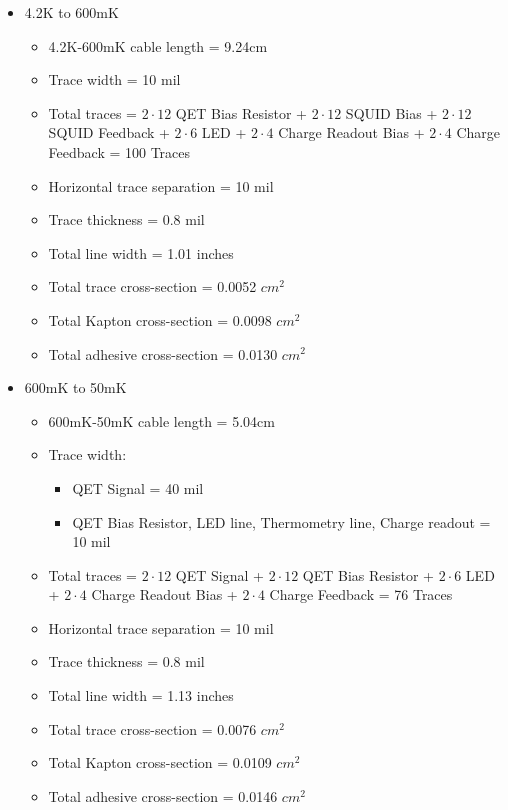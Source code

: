 \documentclass{report}
\begin{document}
\begin{itemize}
\item 4.2K to 600mK
    \begin{itemize}
    \item 4.2K-600mK cable length = 9.24cm
    \item Trace width = 10 mil
    \item Total traces = $2\cdot12$ QET Bias Resistor + $2\cdot12$ SQUID Bias + $2\cdot12$ SQUID Feedback + $2\cdot6$ LED + $2\cdot4$ Charge Readout Bias + $2\cdot4$ Charge Feedback = 100 Traces
    \item Horizontal trace separation = 10 mil
    \item Trace thickness = 0.8 mil
    \item Total line width = 1.01 inches
    \item Total trace cross-section = 0.0052 $cm^2$
    \item Total Kapton cross-section = 0.0098 $cm^2$
    \item Total adhesive cross-section = 0.0130 $cm^2$
    \end{itemize}
\item 600mK to 50mK
    \begin{itemize}
    \item 600mK-50mK cable length = 5.04cm
    \item Trace width:
        \begin{itemize}
        \item QET Signal = 40 mil
        \item QET Bias Resistor, LED line, Thermometry line, Charge readout = 10 mil
        \end{itemize}
    \item Total traces = $2\cdot12$ QET Signal + $2\cdot12$ QET Bias Resistor + $2\cdot6$ LED + $2\cdot4$ Charge Readout Bias + $2\cdot4$ Charge Feedback = 76 Traces
    \item Horizontal trace separation = 10 mil
    \item Trace thickness = 0.8 mil
    \item Total line width = 1.13 inches
    \item Total trace cross-section = 0.0076 $cm^2$
    \item Total Kapton cross-section = 0.0109 $cm^2$
    \item Total adhesive cross-section = 0.0146 $cm^2$
    \end{itemize}
\end{itemize}
\end{document}
